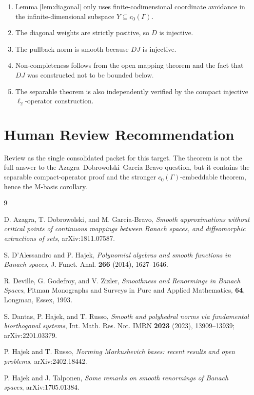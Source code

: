 \documentclass[11pt]{article}
\theoremstyle{definition}
\begin{document}
\begin{enumerate}
\item Lemma \ref{lem:diagonal} only uses finite-codimensional coordinate
avoidance in the infinite-dimensional subspace \(Y\subseteq c_0(\Gamma)\).
\item The diagonal weights are strictly positive, so \(D\) is injective.
\item The pullback norm is smooth because \(DJ\) is injective.
\item Non-completeness follows from the open mapping theorem and the fact that
\(DJ\) was constructed not to be bounded below.
\item The separable theorem is also independently verified by the compact
injective \(\ell_2\)-operator construction.
\end{enumerate}

\section*{Human Review Recommendation}

Review as the single consolidated packet for this target.  The theorem is not
the full answer to the Azagra--Dobrowolski--Garcia-Bravo question, but it
contains the separable compact-operator proof and the stronger
\(c_0(\Gamma)\)-embeddable theorem, hence the M-basis corollary.

\begin{thebibliography}{9}

D. Azagra, T. Dobrowolski, and M. Garcia-Bravo,
\emph{Smooth approximations without critical points of continuous mappings
between Banach spaces, and diffeomorphic extractions of sets},
arXiv:1811.07587.

S. D'Alessandro and P. Hajek,
\emph{Polynomial algebras and smooth functions in Banach spaces},
J. Funct. Anal. \textbf{266} (2014), 1627--1646.

R. Deville, G. Godefroy, and V. Zizler,
\emph{Smoothness and Renormings in Banach Spaces},
Pitman Monographs and Surveys in Pure and Applied Mathematics, \textbf{64},
Longman, Essex, 1993.

S. Dantas, P. Hajek, and T. Russo,
\emph{Smooth and polyhedral norms via fundamental biorthogonal systems},
Int. Math. Res. Not. IMRN \textbf{2023} (2023), 13909--13939;
arXiv:2201.03379.

P. Hajek and T. Russo,
\emph{Norming Markushevich bases: recent results and open problems},
arXiv:2402.18442.

P. Hajek and J. Talponen,
\emph{Some remarks on smooth renormings of Banach spaces},
arXiv:1705.01384.

\end{thebibliography}
\end{document}
